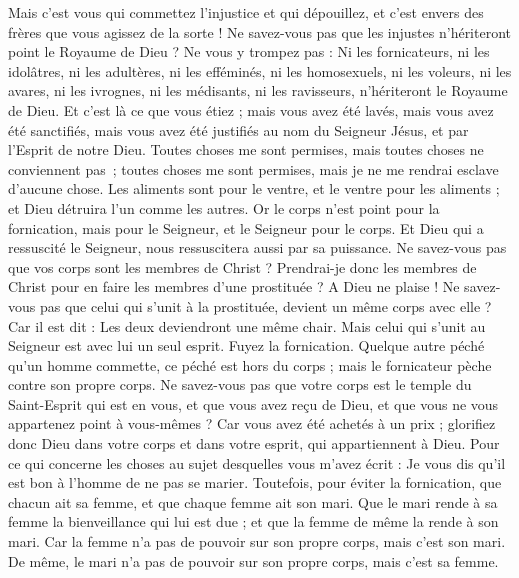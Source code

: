 \begin{multicols}{2}
Mais c'est vous qui commettez l'injustice et qui dépouillez, et c'est envers des frères que vous agissez de la sorte !
Ne savez-vous pas que les injustes n'hériteront point le Royaume de Dieu ? Ne vous y trompez pas : Ni les fornicateurs, ni les idolâtres, ni les adultères,
ni les efféminés, ni les homosexuels, ni les voleurs, ni les avares, ni les ivrognes, ni les médisants, ni les ravisseurs, n'hériteront le Royaume de Dieu.
Et c'est là ce que vous étiez ; mais vous avez été lavés, mais vous avez été sanctifiés, mais vous avez été justifiés au nom du Seigneur Jésus, et par l'Esprit de notre Dieu.
Toutes choses me sont permises, mais toutes choses ne conviennent pas ; toutes choses me sont permises, mais je ne me rendrai esclave d'aucune chose.
Les aliments sont pour le ventre, et le ventre pour les aliments ; et Dieu détruira l'un comme les autres. Or le corps n'est point pour la fornication, mais pour le Seigneur, et le Seigneur pour le corps.
Et Dieu qui a ressuscité le Seigneur, nous ressuscitera aussi par sa puissance.
Ne savez-vous pas que vos corps sont les membres de Christ ? Prendrai-je donc les membres de Christ pour en faire les membres d'une prostituée ? A Dieu ne plaise !
Ne savez-vous pas que celui qui s'unit à la prostituée, devient un même corps avec elle ? Car il est dit : Les deux deviendront une même chair.
Mais celui qui s'unit au Seigneur est avec lui un seul esprit.
Fuyez la fornication. Quelque autre péché qu'un homme commette, ce péché est hors du corps ; mais le fornicateur pèche contre son propre corps.
Ne savez-vous pas que votre corps est le temple du Saint-Esprit qui est en vous, et que vous avez reçu de Dieu, et que vous ne vous appartenez point à vous-mêmes ?
Car vous avez été achetés à un prix ; glorifiez donc Dieu dans votre corps et dans votre esprit, qui appartiennent à Dieu.
\VerseOne{}Pour ce qui concerne les choses au sujet desquelles vous m'avez écrit : Je vous dis qu'il est bon à l'homme de ne pas se marier.
Toutefois, pour éviter la fornication, que chacun ait sa femme, et que chaque femme ait son mari.
Que le mari rende à sa femme la bienveillance qui lui est due ; et que la femme de même la rende à son mari.
Car la femme n'a pas de pouvoir sur son propre corps, mais c'est son mari. De même, le mari n'a pas de pouvoir sur son propre corps, mais c'est sa femme.

\end{multicols}
